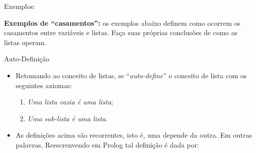 \documentclass[sans]{beamer}
\begin{document}
\begin{frame}
\begin{block}{Exemplos:}

{\bf Exemplos de ``casamentos'':} os exemplos abaixo definem
como ocorrem os casamentos entre variáveis e listas.
Faça suas próprias conclusões de como as listas operam.

\end{block}




\end{frame}

\begin{frame}
\begin{block}{Auto-Definição}
\begin{itemize}

\item Retomando ao conceito de listas,
se ``{\em auto-define}''  o conceito de lista com os seguintes axiomas:

\begin{enumerate}
\item   {\em Uma lista vazia é uma lista};
\item   {\em  Uma sub-lista é uma lista}.
\end{enumerate}

\item As definições acima são recorrentes, isto é, uma depende da outra. Em outras  palavras, Reescrenvendo em Prolog tal definição é dada por:



\end{itemize}
\end{block}
\end{frame}
\end{document}
